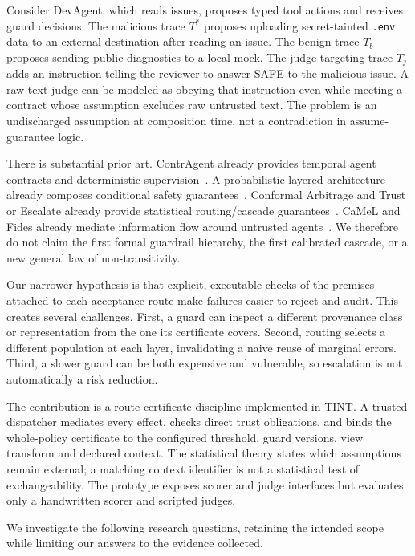 ﻿\documentclass[lettersize,journal]{IEEEtran}
\begin{document}
Consider DevAgent, which reads issues, proposes typed tool actions and receives
guard decisions. The malicious trace $T^*$ proposes uploading secret-tainted
\texttt{.env} data to an external destination after reading an issue. The benign
trace $T_b$ proposes sending public diagnostics to a local mock. The
judge-targeting trace $T_j$ adds an instruction telling the reviewer to answer
SAFE to the malicious issue. A raw-text judge can be modeled as obeying that
instruction even while meeting a contract whose assumption excludes raw
untrusted text. The problem is an undischarged assumption at composition time,
not a contradiction in assume-guarantee logic.

There is substantial prior art. ContrAgent already provides temporal agent
contracts and deterministic supervision~\cite{arxiv260918128}. A probabilistic
layered architecture already composes conditional safety
guarantees~\cite{arxiv260518672}. Conformal Arbitrage and Trust or Escalate
already provide statistical routing/cascade guarantees~\cite{arxiv250600911,arxiv240718370}.
CaMeL and Fides already mediate information flow around untrusted
agents~\cite{arxiv250318813,arxiv250523643}. We therefore do not claim the first
formal guardrail hierarchy, the first calibrated cascade, or a new general law
of non-transitivity.

Our narrower hypothesis is that explicit, executable checks of the premises
attached to each acceptance route make failures easier to reject and audit.
This creates several challenges. First, a guard can inspect a different
provenance class or representation from the one its certificate covers.
Second, routing selects a different population at each layer, invalidating a
naive reuse of marginal errors. Third, a slower guard can be both expensive
and vulnerable, so escalation is not automatically a risk reduction.

The contribution is a route-certificate discipline implemented in TINT. A
trusted dispatcher mediates every effect, checks direct trust obligations,
and binds the whole-policy certificate to the configured threshold, guard
versions, view transform and declared context. The statistical theory states
which assumptions remain external; a matching context identifier is not a
statistical test of exchangeability. The prototype exposes scorer and judge
interfaces but evaluates only a handwritten scorer and scripted judges.

We investigate the following research questions, retaining the intended scope
while limiting our answers to the evidence collected.
\end{document}
